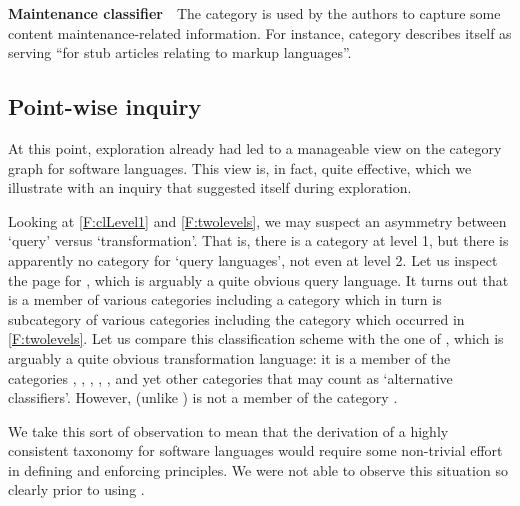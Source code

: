 \smallskip

\noindent
\textbf{Maintenance classifier}\ \ The category is used by the \Wikipedia{} authors to capture some content maintenance-related information. For instance, category  describes itself as serving ``for stub articles relating to markup languages''.


\subsection{Point-wise inquiry}

At this point, exploration already had led to a manageable view on the category graph for software languages. This view is, in fact, quite effective, which we illustrate with an inquiry that suggested itself during exploration.

Looking at \autoref{F:clLevel1} and \autoref{F:twolevels}, we may suspect an asymmetry between `query' versus `transformation'. That is, there is a category  at level 1, but there is apparently no category for `query languages', not even at level 2. Let us inspect the page for , which is arguably a quite obvious query language. It turns out that  is a member of various categories including a category  which in turn is subcategory of various categories including the category  which occurred in \autoref{F:twolevels}. Let us compare this classification scheme with the one of , which is arguably a quite obvious transformation language: it is a member of the categories , , , , , and yet other categories that may count as `alternative classifiers'. However,  (unlike ) is not a member of the category .

We take this sort of observation to mean that the derivation of a highly consistent taxonomy for software languages would require some non-trivial effort in defining and enforcing principles. We were not able to observe this situation so clearly prior to using \WikiTax.

